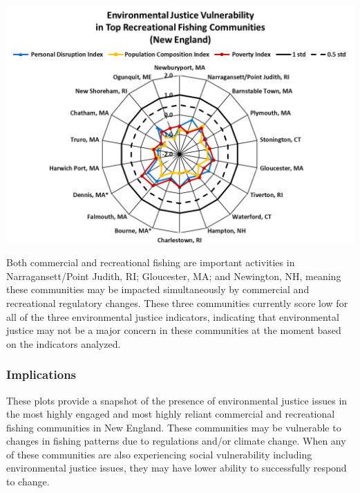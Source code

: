 \documentclass[
  10pt,
]{article}
\let\origfigure\figure
\let\endorigfigure\endfigure
\renewenvironment{figure}[1][2] {
    \expandafter\origfigure\expandafter[H]
} {
    \endorigfigure
}
\begin{document}
\begin{figure}

{\centering \includegraphics[width=0.75\linewidth]{SOE-NEFMC_files/figure-latex/recreational-EJ-1} 

}

\caption{Environmental justice indicators (Poverty Index, population composition index, and personal disruption index) for top recreational fishing communities in New England. *Community scored high (1.00 and above) for both commercial engagement and reliance indicators.}\label{fig:recreational-EJ}
\end{figure}

Both commercial and recreational fishing are important activities in Narragansett/Point Judith, RI; Gloucester, MA; and Newington, NH, meaning these communities may be impacted simultaneously by commercial and recreational regulatory changes. These three communities currently score low for all of the three environmental justice indicators, indicating that environmental justice may not be a major concern in these communities at the moment based on the indicators analyzed.

\hypertarget{implications-4}{%
\subsubsection{Implications}\label{implications-4}}

These plots provide a snapshot of the presence of environmental justice issues in the most highly engaged and most highly reliant commercial and recreational fishing communities in New England. These communities may be vulnerable to changes in fishing patterns due to regulations and/or climate change. When any of these communities are also experiencing social vulnerability including environmental justice issues, they may have lower ability to successfully respond to change.
\end{document}
